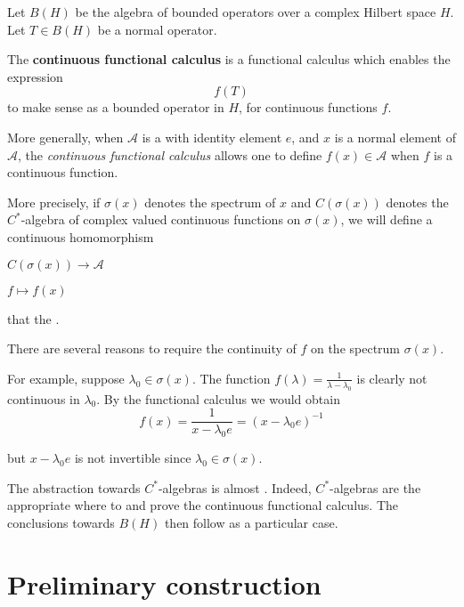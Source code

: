 \documentclass[12pt]{article}
\begin{document}

Let $B(H)$ be the algebra of bounded operators over a complex Hilbert space $H$. Let $T \in B(H)$ be a normal operator.

The {\bf continuous functional calculus} is a functional calculus which enables the expression
\begin{displaymath}
f(T)
\end{displaymath}
to make sense as a bounded operator in $H$, for continuous functions $f$.

More generally, when $\mathcal{A}$ is a  with identity element $e$, and $x$ is a normal element of $\mathcal{A}$, the \emph{continuous functional calculus} allows one to define $f(x) \in \mathcal{A}$ when $f$ is a continuous function.

More precisely, if $\sigma(x)$ denotes the spectrum of $x$ and $C(\sigma(x))$ denotes the $C^*$-algebra of complex valued continuous functions on $\sigma(x)$, we will define a continuous homomorphism 
\begin{center}
$C(\sigma(x)) \longrightarrow \mathcal{A}$

$f \mapsto f(x)$
\end{center}
that  the  .

There are several reasons to require the continuity of $f$ on the spectrum $\sigma(x)$.

For example, suppose $\lambda_0 \in \sigma(x)$. The function $f(\lambda) = \frac{1}{\lambda - \lambda_0}$ is clearly not continuous in $\lambda_0$. By the functional calculus  we would obtain
\begin{displaymath}
f(x)= \frac{1}{x-\lambda_0 e} = (x - \lambda_0 e)^{-1}
\end{displaymath}

but $x - \lambda_0 e$ is not invertible since $\lambda_0 \in \sigma(x)$.

The abstraction towards $C^*$-algebras is almost . Indeed, $C^*$-algebras are the appropriate  where to  and prove the continuous functional calculus. The conclusions towards $B(H)$ then follow as a particular case.

\section{Preliminary construction}
\end{document}
